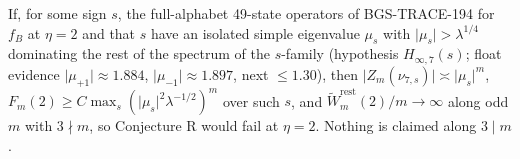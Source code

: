 \begin{theorem}
If, for some sign \(s\), the full-alphabet 49-state operators of BGS-TRACE-194 for \(f_B\) at \(\eta=2\) and that \(s\) have an isolated simple eigenvalue \(\mu_s\) with \(\lvert\mu_s\rvert>\lambda^{1/4}\) dominating the rest of the spectrum of the \(s\)-family (hypothesis \(H_{\infty,7}(s)\); float evidence \(\lvert\mu_{+1}\rvert\approx1.884\), \(\lvert\mu_{-1}\rvert\approx1.897\), next \(\le1.30\)), then \(\lvert Z_m(\nu_{7,s})\rvert\asymp\lvert\mu_s\rvert^m\), \(F_m(2)\ge C\max_s(\lvert\mu_s\rvert^2\lambda^{-1/2})^m\) over such \(s\), and \(\tilde W^{\mathrm{rest}}_m(2)/m\to\infty\) along odd \(m\) with \(3\nmid m\), so Conjecture R would fail at \(\eta=2\). Nothing is claimed along \(3\mid m\).
\end{theorem}
